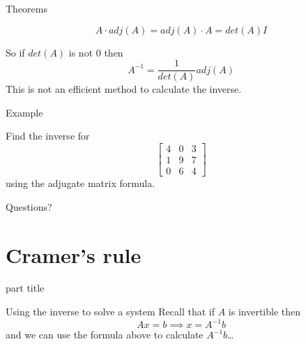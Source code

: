 \documentclass{beamer}
\begin{document}
\begin{frame}{Theorems}
  \begin{theorem}
    \begin{equation*}
      A\cdot adj(A) = adj(A)\cdot A = det(A) I
    \end{equation*}
  \end{theorem}\vfill
  So if $det(A)$ is not $0$ then
  \begin{equation*}
    A^{-1} = \frac{1}{det(A)}adj(A)
  \end{equation*}
  This is not an efficient method to calculate the inverse.
\end{frame}

\begin{frame}{Example}
  \begin{example}
    Find the inverse for
    \begin{equation*}
      \left[
	\begin{array}{ccc}
          4&0&3\\
          1&9&7\\
          0&6&4
	\end{array}
      \right]
    \end{equation*}
    using the adjugate matrix formula.
  \end{example}
\end{frame}

\begin{frame}
  Questions?
\end{frame}

\section{Cramer's rule}

\begin{frame}
  \begin{beamercolorbox}[sep=12pt,center]{part title}
    \insertsection\par
  \end{beamercolorbox}
\end{frame}

\begin{frame}{Using the inverse to solve a system}
  Recall that if $A$ is invertible then
  \begin{equation*}
    Ax=b \implies x = A^{-1}b
  \end{equation*}
  and we can use the formula above to calculate $A^{-1}b$\dots
\end{frame}
\end{document}
